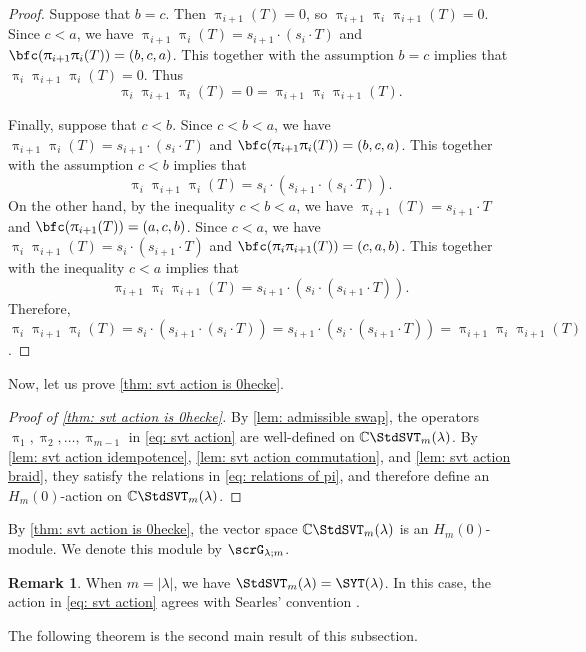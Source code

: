 \documentclass[12pt, reqno]{amsart}
\numberwithin{equation}{section}
\numberwithin{figure}{section}
\numberwithin{table}{section}
\theoremstyle{definition}
\newtheorem{remark}[theorem]{Remark}
\def\C{\mathbb C}
\begin{document}
\begin{proof}
Suppose that $b=c$.
Then $\uppi_{i+1}(T)=0$, so $\uppi_{i+1}\uppi_i\uppi_{i+1}(T)=0$.
Since $c<a$, we have $\uppi_{i+1}\uppi_i(T)=s_{i+1} \cdot (s_i \cdot T)$ and $\bfc(\uppi_{i+1}\uppi_i(T))=(b,c,a)$.
This together with the assumption $b=c$ implies that $\uppi_i\uppi_{i+1}\uppi_i(T)=0$.
Thus
\[
\uppi_i\uppi_{i+1}\uppi_i(T) = 0 = \uppi_{i+1}\uppi_i\uppi_{i+1}(T).
\]

Finally, suppose that $c<b$.
Since $c<b<a$, we have $\uppi_{i+1}\uppi_i(T)=s_{i+1} \cdot (s_i \cdot T)$ and $\bfc(\uppi_{i+1}\uppi_i(T))=(b,c,a)$.
This together with the assumption $c<b$ implies that 
\[
\uppi_i\uppi_{i+1}\uppi_i(T)=s_i \cdot (s_{i+1} \cdot (s_i \cdot T)).
\]
On the other hand, by the inequality $c<b<a$, we have $\uppi_{i+1}(T)=s_{i+1} \cdot T$ and $\bfc(\uppi_{i+1}(T))=(a,c,b)$.
Since $c < a$, we have $\uppi_i\uppi_{i+1}(T)=s_i \cdot (s_{i+1} \cdot T)$ and $\bfc(\uppi_i\uppi_{i+1}(T))=(c,a,b)$.
This together with the inequality $c<a$ implies that
\[
\uppi_{i+1}\uppi_i\uppi_{i+1}(T)=s_{i+1} \cdot (s_i \cdot (s_{i+1} \cdot T)).
\]
Therefore, $\uppi_i\uppi_{i+1}\uppi_i(T) 
= s_{i} \cdot (s_{i+1} \cdot (s_{i} \cdot T)) 
= s_{i+1} \cdot (s_i \cdot (s_{i+1} \cdot T)) 
= \uppi_{i+1}\uppi_i\uppi_{i+1}(T)$.
\end{proof}

Now, let us prove \cref{thm: svt action is 0hecke}.


\begin{proof}[Proof of \cref{thm: svt action is 0hecke}]
By \cref{lem: admissible swap}, the operators $\uppi_1, \uppi_2, \ldots,
\uppi_{m-1}$ in \cref{eq: svt action} are well-defined on
$\C\StdSVT_m(\lambda)$.
By \cref{lem: svt action idempotence}, \cref{lem: svt action commutation}, and \cref{lem: svt action braid}, they satisfy the relations in
\cref{eq: relations of pi}, and therefore define an $H_m(0)$-action on $\C\StdSVT_m(\lambda)$.
\end{proof}


By \cref{thm: svt action is 0hecke}, the vector space $\C\StdSVT_m(\lambda)$ is an $H_m(0)$-module.
We denote this module by $\scrG_{\lambda;m}$.

\begin{remark}
When $m=|\lambda|$, we have $\StdSVT_m(\lambda)=\SYT(\lambda)$.
In this case, the action in \cref{eq: svt action} agrees with Searles' convention \cite{Searles20}.
\end{remark}


The following theorem is the second main result of this subsection.
\end{document}
